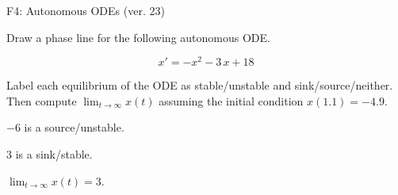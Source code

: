 \begin{exercise}
  \begin{exerciseTitle}F4: Autonomous ODEs (ver. 23)\end{exerciseTitle}
  \begin{exerciseStatement}
    

      Draw a phase line for the following 
      autonomous ODE.
    

    
\[x'= -x^{2} - 3 \, x + 18\]

    

      Label each equilibrium of the ODE
      as stable/unstable and sink/source/neither.
      Then compute \(\lim_{t\to\infty}x(t)\)
      assuming the initial condition
      \(x( 1.1 )= -4.9\).
    

  \end{exerciseStatement}
  \begin{exerciseAnswer}
    

      \(-6\) is a source/unstable.
      
      \(3\) is a sink/stable.
    

    

      \(\lim_{t\to\infty}x(t)=3\).
    

  \end{exerciseAnswer}
\end{exercise}
